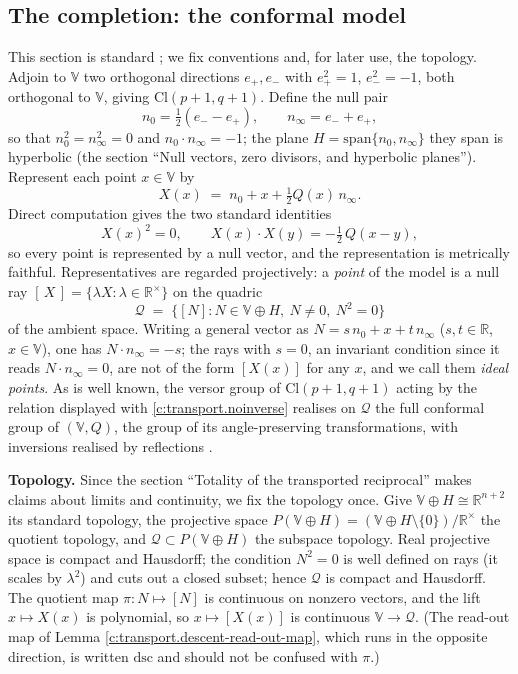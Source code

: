 \documentclass[11pt]{article}
\theoremstyle{definition}
\theoremstyle{plain}
\providecommand{\Cl}{}\renewcommand{\Cl}{\mathrm{Cl}}
\providecommand{\R}{}\renewcommand{\R}{\mathbb{R}}
\providecommand{\dsc}{}\renewcommand{\dsc}{\mathrm{dsc}}
\providecommand{\nInf}{}\renewcommand{\nInf}{n_\infty}
\providecommand{\nO}{}\renewcommand{\nO}{n_0}
\begin{document}
\subsection*{The completion: the conformal model}
\label{c:note.transport.setting-completion-conformal-model}
This section is standard \cite{Hestenes2001, HLR2001, DFM2007, DoranLasenby2003}; we fix conventions and, for later use, the topology. Adjoin to $\mathbb{V}$ two orthogonal directions $e_+, e_-$ with $e_+^2 = 1$, $e_-^2 = -1$, both orthogonal to $\mathbb{V}$, giving $\Cl(p{+}1, q{+}1)$. Define the null pair
\[
\nO = \tfrac12(e_- - e_+), \qquad \nInf = e_- + e_+,
\]
so that $\nO^2 = \nInf^2 = 0$ and $\nO \cdot \nInf = -1$; the plane $H = \mathrm{span}\{\nO, \nInf\}$ they span is hyperbolic (the section ``Null vectors, zero divisors, and hyperbolic planes''). Represent each point $x \in \mathbb{V}$ by
\begin{equation}
X(x) \;=\; \nO + x + \tfrac12 Q(x)\, \nInf .
\end{equation}
Direct computation gives the two standard identities
\begin{equation}
X(x)^2 = 0, \qquad X(x)\cdot X(y) = -\tfrac12\, Q(x-y),
\end{equation}
so every point is represented by a null vector, and the representation is metrically faithful. Representatives are regarded projectively: a \emph{point} of the model is a null ray $[\,X\,] = \{\lambda X : \lambda \in \R^\times\}$ on the quadric
\[
\mathcal{Q} \;=\; \{[N] : N \in \mathbb{V} \oplus H,\ N \neq 0,\ N^2 = 0\}
\]
of the ambient space. Writing a general vector as $N = s\,\nO + x + t\,\nInf$ ($s, t \in \R$, $x \in \mathbb{V}$), one has $N \cdot \nInf = -s$; the rays with $s = 0$, an invariant condition since it reads $N \cdot \nInf = 0$, are not of the form $[X(x)]$ for any $x$, and we call them \emph{ideal points}. As is well known, the versor group of $\Cl(p{+}1,q{+}1)$ acting by the relation displayed with \ref{c:transport.noinverse} realises on $\mathcal{Q}$ the full conformal group of $(\mathbb{V}, Q)$, the group of its angle-preserving transformations, with inversions realised by reflections \cite{HLR2001, Angles2008}.

\label{c:note.transport.setting-completion-conformal-model-2}
\textbf{Topology.} Since the section ``Totality of the transported reciprocal'' makes claims about limits and continuity, we fix the topology once. Give $\mathbb{V} \oplus H \cong \R^{n+2}$ its standard topology, the projective space $P(\mathbb{V} \oplus H) = (\mathbb{V} \oplus H \setminus \{0\})/\R^{\times}$ the quotient topology, and $\mathcal{Q} \subset P(\mathbb{V} \oplus H)$ the subspace topology. Real projective space is compact and Hausdorff; the condition $N^2 = 0$ is well defined on rays (it scales by $\lambda^2$) and cuts out a closed subset; hence $\mathcal{Q}$ is compact and Hausdorff. The quotient map $\pi : N \mapsto [N]$ is continuous on nonzero vectors, and the lift $x \mapsto X(x)$ is polynomial, so $x \mapsto [X(x)]$ is continuous $\mathbb{V} \to \mathcal{Q}$. (The read-out map of Lemma \ref{c:transport.descent-read-out-map}, which runs in the opposite direction, is written $\dsc$ and should not be confused with $\pi$.)
\end{document}
